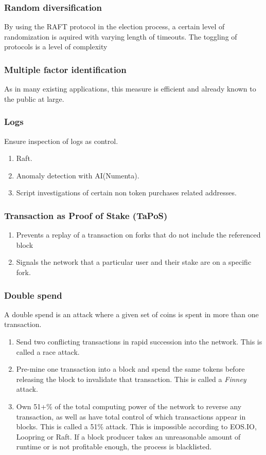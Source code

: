 \documentclass[]{article}
\begin{document}
		\subsubsection{Random diversification}
		By using the RAFT protocol in the election process, a certain level of randomization is aquired with varying length of timeouts. 
		The toggling of protocols is a level of complexity 
		\subsubsection{Multiple factor identification}
		As in many existing applications, this measure is efficient and already known to the public at large.
		\subsubsection {Logs}
			Ensure inspection of logs as control.
			\begin{enumerate}
				\item Raft.
				\item Anomaly detection with AI(Numenta).
				\item Script investigations of certain non token purchases related addresses.
			\end{enumerate}
		\subsubsection{Transaction as Proof of Stake (TaPoS)}
			\begin{enumerate}
				\item Prevents a replay of a transaction on forks that do not include the referenced block 
				\item Signals the network that a particular user and their stake are on a specific fork.
			\end{enumerate}
		\subsubsection{Double spend}
		A double spend is an attack where a given set of coins is spent in more than one transaction.
		\begin{enumerate}
			\item Send two conflicting transactions in rapid succession into the network. This is called a race attack. 
			\item Pre-mine one transaction into a block and spend the same tokens before releasing the block to invalidate that transaction. 
			This is called a \textit{Finney} attack.
			\item Own 51+\% of the total computing power of the network to reverse any transaction, 
			as well as have total control of which transactions appear in blocks. 
			This is called a 51\% attack.
			This is impossible according to EOS.IO, Loopring or Raft.
			If a block producer takes an unreasonable amount of runtime or is not profitable enough, the process is blacklisted.\cite{7}
		\end{enumerate} 
\end{document}
